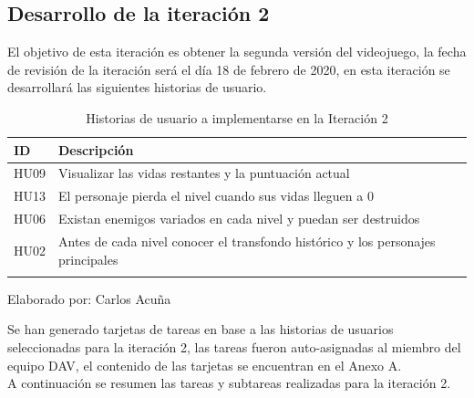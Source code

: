 \documentclass[a4paper, openright, 12pt]{report}
\begin{document}
\subsection*{Desarrollo de la iteración 2}
\justify
El objetivo de esta iteración es obtener la segunda versión del videojuego, la fecha de revisión de la iteración será el día 18 de febrero de 2020, en esta iteración se desarrollará las siguientes historias de usuario.

\begin{longtable}{| l | p{5cm} |}
\hline
\captionsetup{justification=centering,margin=2cm}
\textbf{ID} & \textbf{Descripción} \\ \hline
HU09 &
Visualizar las vidas restantes y la puntuación actual \\ \hline
HU13 &
El personaje pierda el nivel cuando sus vidas lleguen a 0 \\ \hline
HU06 &
Existan enemigos variados en cada nivel y puedan ser destruidos\\ \hline
HU02 &
Antes de cada nivel conocer el transfondo histórico y los personajes principales \\ \hline
\caption{Historias de usuario a implementarse en la Iteración 2}
\end{longtable}
\begin{center}
Elaborado por: Carlos Acuña
\end{center}
\justify
Se han generado tarjetas de tareas en base a las historias de usuarios seleccionadas para la iteración 2, las tareas fueron auto-asignadas al miembro del equipo DAV, el contenido de las tarjetas se encuentran en el Anexo A.\\
A continuación se resumen las tareas y subtareas realizadas para la iteración 2.
\end{document}
